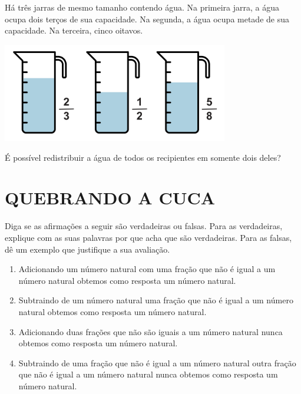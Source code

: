 \begin{atividade}{}

Há três jarras de mesmo tamanho contendo água. 
Na primeira jarra, a água ocupa dois terços de sua capacidade. 
Na segunda, a água ocupa metade de sua capacidade. 
Na terceira, cinco oitavos.

\begin{center}
  \includegraphics[width=280pt, keepaspectratio]{../figuras/licao05/ativ14_fig01.png}
\end{center}

É possível redistribuir a água de todos os recipientes em somente dois deles?
\end{atividade}

\section{QUEBRANDO A CUCA }


\begin{atividade}{}

Diga se as afirmações a seguir são verdadeiras ou falsas. Para as verdadeiras, explique com as suas palavras por que acha que são verdadeiras. Para as falsas, dê um exemplo que justifique a sua avaliação.
\begin{enumerate} [\quad a)] %
  \item     Adicionando um número natural com uma fração que não é igual a um número natural obtemos como resposta um número natural.
  \item     Subtraindo de  um número natural  uma fração que não é igual a um número natural obtemos como resposta um número natural. 
  \item     Adicionando duas frações que não são iguais a um número natural nunca obtemos como resposta um número natural.
  \item     Subtraindo de uma fração que não é igual a um número natural outra fração que não é igual a um número natural nunca obtemos como resposta um número natural. 
\end{enumerate} %
\end{atividade}

